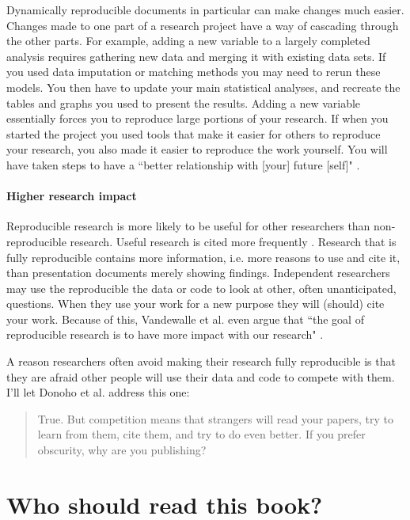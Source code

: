 Dynamically reproducible documents in particular can make changes much easier. Changes made to one part of a research project have a way of cascading through the other parts. For example, adding a new variable to a largely completed analysis requires gathering new data and merging it with existing data sets. If you used data imputation or matching methods you may need to rerun these models. You then have to update your main statistical analyses, and recreate the tables and graphs you used to present the results. Adding a new variable essentially forces you to reproduce large portions of your research. If when you started the project you used tools that make it easier for others to reproduce your research, you also made it easier to reproduce the work yourself. You will have taken steps to have a ``better relationship with [your] future [self]" \cite[]{Bowers2011}.

\paragraph{Higher research impact}
Reproducible research is more likely to be useful for other researchers than non-reproducible research. Useful research is cited more frequently \cite[]{Donoho2002,Piwowar2007,Vandewalle2012}. Research that is fully reproducible contains more information, i.e. more reasons to use and cite it, than presentation documents merely showing findings. Independent researchers may use the reproducible the data or code to look at other, often unanticipated, questions. When they use your work for a new purpose they will (should) cite your work. Because of this, Vandewalle et al. even argue that ``the goal of reproducible research is to have more impact with our research"  \citeyearpar[1253]{Vandewalle2007}.

A reason researchers often avoid making their research fully reproducible is that they are afraid other people will use their data and code to compete with them. I'll let Donoho et al. address this one:

\begin{quote}
    True. But competition means that strangers will read your papers, try to learn from them, cite them, and try to do even better. If you prefer obscurity, why are you publishing? \citeyearpar[16]{Donoho2009}
\end{quote}

\section{Who should read this book?}


